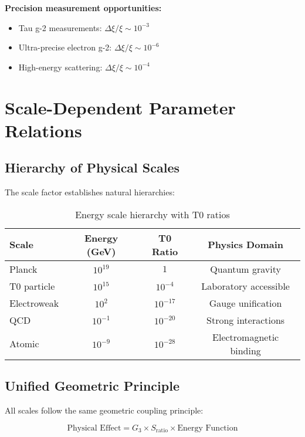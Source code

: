 \documentclass[12pt,a4paper]{report}
\begin{document}
\textbf{Precision measurement opportunities:}
\begin{itemize}
	\item Tau g-2 measurements: $\Delta\xi/\xi \sim 10^{-3}$
	\item Ultra-precise electron g-2: $\Delta\xi/\xi \sim 10^{-6}$
	\item High-energy scattering: $\Delta\xi/\xi \sim 10^{-4}$
\end{itemize}

\section{Scale-Dependent Parameter Relations}
\label{sec:scale_dependent}

\subsection{Hierarchy of Physical Scales}
\label{subsec:hierarchy_scales}

The scale factor establishes natural hierarchies:

\begin{table}[htbp]
	\centering
	\begin{tabular}{lccc}
		\toprule
		\textbf{Scale} & \textbf{Energy (GeV)} & \textbf{T0 Ratio} & \textbf{Physics Domain} \\
		\midrule
		Planck & $10^{19}$ & $1$ & Quantum gravity \\
		T0 particle & $10^{15}$ & $10^{-4}$ & Laboratory accessible \\
		Electroweak & $10^{2}$ & $10^{-17}$ & Gauge unification \\
		QCD & $10^{-1}$ & $10^{-20}$ & Strong interactions \\
		Atomic & $10^{-9}$ & $10^{-28}$ & Electromagnetic binding \\
		\bottomrule
	\end{tabular}
	\caption{Energy scale hierarchy with T0 ratios}
	\label{tab:energy_hierarchy}
\end{table}

\subsection{Unified Geometric Principle}
\label{subsec:unified_geometric_principle}

All scales follow the same geometric coupling principle:

\begin{equation}
	\text{Physical Effect} = G_3 \times S_{\text{ratio}} \times \text{Energy Function}
\end{equation}
\end{document}
